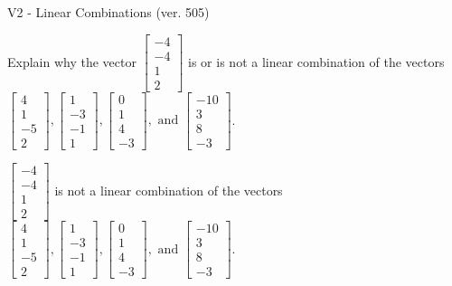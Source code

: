 \begin{exercise}
  \begin{exerciseTitle}V2 - Linear Combinations (ver. 505)\end{exerciseTitle}
  \begin{exerciseStatement}
    Explain why the vector \(\left[\begin{array}{c}
-4 \\
-4 \\
1 \\
2
\end{array}\right]\)  is or is not a linear 
	combination of the vectors \(\left[\begin{array}{c}
4 \\
1 \\
-5 \\
2
\end{array}\right] , \left[\begin{array}{c}
1 \\
-3 \\
-1 \\
1
\end{array}\right] , \left[\begin{array}{c}
0 \\
1 \\
4 \\
-3
\end{array}\right] , \text{ and } \left[\begin{array}{c}
-10 \\
3 \\
8 \\
-3
\end{array}\right]\).
	


  \end{exerciseStatement}
  \begin{exerciseAnswer}
   \(\left[\begin{array}{c}
-4 \\
-4 \\
1 \\
2
\end{array}\right]\) 
  	 is not  
	a linear combination of the vectors \(\left[\begin{array}{c}
4 \\
1 \\
-5 \\
2
\end{array}\right] , \left[\begin{array}{c}
1 \\
-3 \\
-1 \\
1
\end{array}\right] , \left[\begin{array}{c}
0 \\
1 \\
4 \\
-3
\end{array}\right] , \text{ and } \left[\begin{array}{c}
-10 \\
3 \\
8 \\
-3
\end{array}\right]\).


\end{exerciseAnswer}
\end{exercise}
